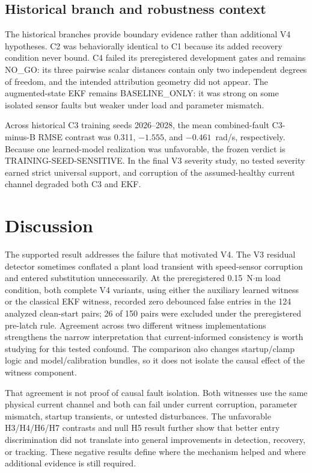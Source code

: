 \documentclass[conference]{IEEEtran}
\begin{document}
\subsection{Historical branch and robustness context}

The historical branches provide boundary evidence rather than additional V4
hypotheses. C2 was behaviorally identical to C1 because its added recovery
condition never bound. C4 failed its preregistered development gates and
remains NO\_GO: its three pairwise scalar distances contain only two
independent degrees of freedom, and the intended attribution geometry did not
appear. The augmented-state EKF remains BASELINE\_ONLY: it was strong on some
isolated sensor faults but weaker under load and parameter mismatch.

Across historical C3 training seeds 2026--2028, the mean combined-fault
C3-minus-B RMSE contrast was 0.311, $-1.555$, and $-0.461$~rad/s,
respectively. Because one learned-model realization was unfavorable, the
frozen verdict is TRAINING-SEED-SENSITIVE. In the final V3 severity study, no
tested severity earned strict universal support, and corruption of the
assumed-healthy current channel degraded both C3 and EKF.

\section{Discussion}
\label{sec:discussion}

The supported result addresses the failure that motivated V4. The V3
residual detector sometimes conflated a plant load transient with
speed-sensor corruption and entered substitution unnecessarily. At the
preregistered 0.15~N$\cdot$m load condition, both complete V4 variants,
using either the auxiliary learned witness or the classical EKF witness,
recorded zero debounced false entries in the 124 analyzed clean-start pairs;
26 of 150 pairs
were excluded under the preregistered pre-latch rule. Agreement across two
different witness implementations strengthens the narrow interpretation that
current-informed consistency is worth studying for this tested confound.
The comparison also changes startup/clamp logic and model/calibration
bundles, so it does not isolate the causal effect of the witness component.

That agreement is not proof of causal fault isolation. Both witnesses use the
same physical current channel and both can fail under current corruption,
parameter mismatch, startup transients, or untested disturbances. The
unfavorable H3/H4/H6/H7 contrasts and null H5 result further show that better
entry discrimination did not translate into general improvements in
detection, recovery, or tracking. These negative results define where the
mechanism helped and where additional evidence is still required.
\end{document}
